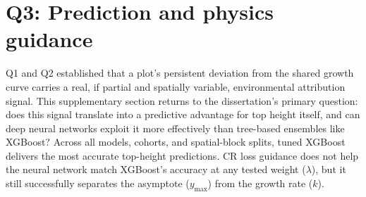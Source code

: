 \documentclass[logo,msc,ai]{infthesis}           %
\begin{document}
\section{Q3: Prediction and physics guidance}
\label{sec:results-q3}
Q1 and Q2 established that a plot's persistent deviation from the shared growth curve carries a real, if partial and spatially variable, environmental attribution signal. This supplementary section returns to the dissertation's primary question: does this signal translate into a predictive advantage for top height itself, and can deep neural networks exploit it more effectively than tree-based ensembles like XGBoost? Across all models, cohorts, and spatial-block splits, tuned XGBoost delivers the most accurate top-height predictions. CR loss guidance does not help the neural network match XGBoost's accuracy at any tested weight ($\lambda$), but it still successfully separates the asymptote ($y_{\max}$) from the growth rate ($k$).
\end{document}
